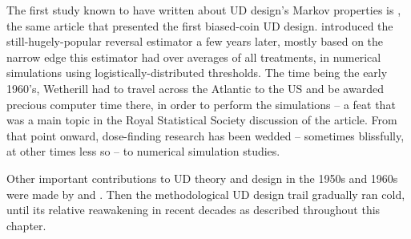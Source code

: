 The first study known to have written about UD design's Markov properties is \cite{Derm:Nonp:1957}, the same article that presented the first biased-coin UD design. \cite{Weth:Chen:Vasu:est:1966} introduced the still-hugely-popular reversal estimator a few years later, mostly based on the narrow edge this estimator had over averages of all treatments, in numerical simulations using logistically-distributed thresholds. The time being the early 1960's, Wetherill had to travel across the Atlantic to the US and be awarded precious computer time there, in order to perform the simulations -- a feat that was a main topic in the Royal Statistical Society discussion of the \cite{Weth:Sequ:1963} article. From that point onward, dose-finding research has been wedded -- sometimes blissfully, at other times less so -- to numerical simulation studies.

Other important contributions to UD theory and design in the 1950s and 1960s were made by \cite{BrownleeEtAl53} and \cite{Tsut:asym:1967,Tsut:rand:1967}. Then the methodological UD design trail gradually ran cold, until its relative reawakening in recent decades as described throughout this chapter.
